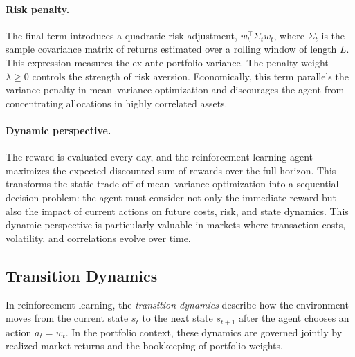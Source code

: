 \documentclass[10pt,leqno]{amsart}
\begin{document}
\paragraph{Risk penalty.}
The final term introduces a quadratic risk adjustment, $w_t^\top \Sigma_t w_t$, where $\Sigma_t$ is the sample covariance matrix of returns estimated over a rolling window of length $L$. This expression measures the ex-ante portfolio variance. The penalty weight $\lambda \geq 0$ controls the strength of risk aversion. Economically, this term parallels the variance penalty in mean--variance optimization and discourages the agent from concentrating allocations in highly correlated assets.

\paragraph{Dynamic perspective.}
The reward is evaluated every day, and the reinforcement learning agent maximizes the expected discounted sum of rewards over the full horizon. This transforms the static trade-off of mean--variance optimization into a sequential decision problem: the agent must consider not only the immediate reward but also the impact of current actions on future costs, risk, and state dynamics. This dynamic perspective is particularly valuable in markets where transaction costs, volatility, and correlations evolve over time.

\subsection{Transition Dynamics}

In reinforcement learning, the \emph{transition dynamics} describe how the environment moves from the current state $s_t$ to the next state $s_{t+1}$ after the agent chooses an action $a_t = w_t$. In the portfolio context, these dynamics are governed jointly by realized market returns and the bookkeeping of portfolio weights.
\end{document}
